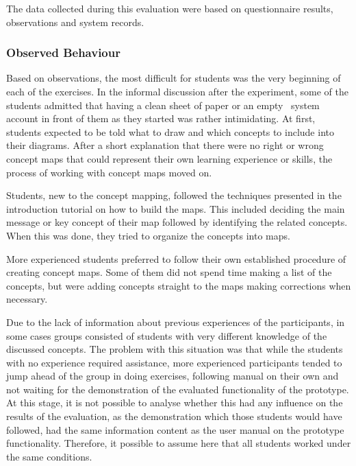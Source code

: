 The data collected during this evaluation were based on questionnaire results,
observations and system records.

\subsubsection{Observed Behaviour}

Based on observations, the most difficult for students was the very beginning of
each of the exercises. In the informal discussion after the experiment, some
of the students admitted that having a clean sheet of paper or an empty
\ep~system account in front of them as they started was rather intimidating. At
first, students expected to be told what to draw and which concepts to include
into their diagrams. After a short explanation that there were no right or wrong
concept maps that could represent their own learning experience or skills, the
process of working with concept maps moved on.

Students, new to the concept mapping, followed the techniques presented in the
introduction tutorial on how to build the maps. This included deciding the main
message or key concept of their map followed by identifying the related
concepts. When this was done, they tried to organize the concepts into maps.


More experienced students preferred to follow their own established procedure of
creating concept maps. Some of them did not spend time making a list of the
concepts, but were adding concepts straight to the maps making corrections when
necessary.

Due to the lack of information about previous experiences of the participants,
in some cases groups consisted of students with very different knowledge of the
discussed concepts. The problem with this situation was that while the students
with no experience required assistance, more experienced participants tended to
jump ahead of the group in doing exercises, following manual on their own and
not waiting for the demonstration of the evaluated functionality of the
prototype. At this stage, it is not possible to analyse whether this had any
influence on the results of the evaluation, as the demonstration which those
students would have followed, had the same information content as the user
manual on the prototype functionality. Therefore, it possible to assume here
that all students worked under the same conditions.

